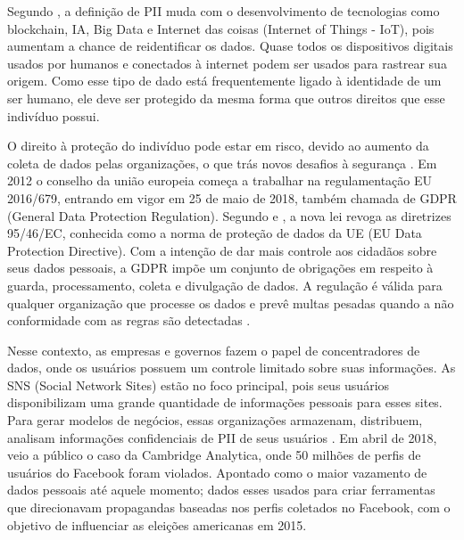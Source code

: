 
Segundo \citet{Schwerin2018}, a definição de PII muda com o desenvolvimento de tecnologias como blockchain, IA, Big Data e Internet das coisas (Internet of Things - IoT), pois aumentam a chance de reidentificar os dados. %
Quase todos os dispositivos digitais usados por humanos e conectados à internet podem ser usados para rastrear sua origem. %
Como esse tipo de dado está frequentemente ligado à identidade de um ser humano, ele deve ser protegido da mesma forma que outros direitos que esse indivíduo possui.


O direito à proteção do indivíduo pode estar em risco, devido ao aumento da coleta de dados pelas organizações, o que trás novos desafios à segurança \citep{Teixeira2019:article}. Em 2012 o conselho da união europeia começa a trabalhar na regulamentação EU 2016/679, entrando em vigor em 25 de maio de 2018, também chamada de GDPR (General Data Protection Regulation). Segundo \citet{gabriela_eu_2018:article} e \citet{Teixeira2019:article}, a nova lei revoga as diretrizes 95/46/EC, conhecida como a norma de proteção de dados da UE (EU Data Protection Directive). Com a intenção de dar mais controle aos cidadãos sobre seus dados pessoais, a GDPR impõe um conjunto de obrigações em respeito à guarda, processamento, coleta e divulgação de dados. A regulação é válida para qualquer organização que processe os dados e prevê multas pesadas quando a não conformidade com as regras são detectadas \citep{EuropeanCommission2016:misc}.

Nesse contexto, as empresas e governos fazem o papel de concentradores de dados, onde os usuários possuem um controle limitado sobre suas informações. As SNS (Social Network Sites) estão no foco principal, pois seus usuários disponibilizam uma grande quantidade de informações pessoais para esses sites. Para gerar modelos de negócios, essas organizações armazenam, distribuem, analisam informações confidenciais de PII de seus usuários \cite{Al-ZabenNasr2018:article}. Em abril de 2018, veio a público o caso da Cambridge Analytica, onde 50 milhões de perfis de usuários do Facebook foram violados. Apontado como o maior vazamento de dados pessoais até aquele momento; dados esses usados para criar ferramentas que direcionavam propagandas baseadas nos perfis coletados no Facebook, com o objetivo de influenciar as eleições americanas em 2015.

